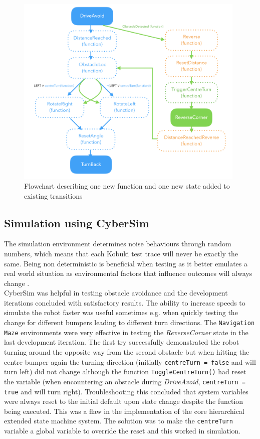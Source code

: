 \begin{figure}[H]
    \centering
    \includegraphics[width=11cm]{Images/DriveAvoidStruct.png}
    \caption{Flowchart describing one new function and one new state added to existing transitions}
    \label{fig:DriveAvoidStructs}
\end{figure}

\subsection{Simulation using CyberSim}\label{sec:cybersim}
\vspace{-0.2cm} The simulation environment determines noise behaviours through random numbers, which means that each Kobuki test trace will never be exactly the same. Being non deterministic is beneficial when testing as it better emulates a real world situation as environmental factors that influence outcomes will always change \cite{labguide}.\\

CyberSim was helpful in testing obstacle avoidance and the development iterations concluded with satisfactory results. The ability to increase speeds to simulate the robot faster was useful sometimes e.g. when quickly testing the change for different bumpers leading to different turn directions. The \texttt{Navigation Maze} environments were very effective in testing the \textit{ReverseCorner} state in the last development iteration. The first try successfully demonstrated the robot turning around the opposite way from the second obstacle but when hitting the centre bumper again the turning direction (initially \texttt{centreTurn = false} and will turn left) did not change although the function \texttt{ToggleCentreTurn()} had reset the variable (when encountering an obstacle during \textit{DriveAvoid}, \texttt{centreTurn = true} and will turn right). Troubleshooting this concluded that system variables were always reset to the initial default upon state change despite the function being executed. This was a flaw in the implementation of the core hierarchical extended state machine system. The solution was to make the \texttt{centreTurn} variable a global variable to override the reset and this worked in simulation.\\ 

